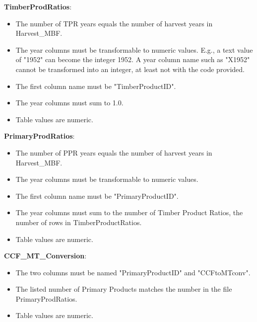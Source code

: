 \documentclass[
  openany]{book}
\providecommand{\tightlist}{%
  \setlength{\itemsep}{0pt}\setlength{\parskip}{0pt}}
\begin{document}
\textbf{TimberProdRatios}:

\begin{itemize}
\tightlist
\item
  The number of TPR years equals the number of harvest years in
  Harvest\_MBF.\\
\item
  The year columns must be transformable to numeric values. E.g., a text
  value of "1952" can become the integer 1952. A year column name such
  as "X1952" cannot be transformed into an integer, at least not with
  the code provided.\\
\item
  The first column name must be "TimberProductID".\\
\item
  The year columns must sum to 1.0.\\
\item
  Table values are numeric.
\end{itemize}

\textbf{PrimaryProdRatios}:

\begin{itemize}
\tightlist
\item
  The number of PPR years equals the number of harvest years in
  Harvest\_MBF.\\
\item
  The year columns must be transformable to numeric values.\\
\item
  The first column name must be "PrimaryProductID".\\
\item
  The year columns must sum to the number of Timber Product Ratios, the
  number of rows in TimberProductRatios.\\
\item
  Table values are numeric.
\end{itemize}

\textbf{CCF\_MT\_Conversion}:

\begin{itemize}
\tightlist
\item
  The two columns must be named "PrimaryProductID" and "CCFtoMTconv".\\
\item
  The listed number of Primary Products matches the number in the file
  PrimaryProdRatios.\\
\item
  Table values are numeric.
\end{itemize}
\end{document}
